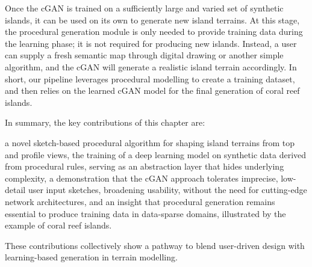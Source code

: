 Once the cGAN is trained on a sufficiently large and varied set of synthetic islands, it can be used on its own to generate new island terrains. At this stage, the procedural generation module is only needed to provide training data during the learning phase; it is not required for producing new islands. Instead, a user can supply a fresh semantic map through digital drawing or another simple algorithm, and the cGAN will generate a realistic island terrain accordingly. In short, our pipeline leverages procedural modelling to create a training dataset, and then relies on the learned cGAN model for the final generation of coral reef islands.


In summary, the key contributions of this chapter are:
\begin{Itemize}
\Item{} a novel sketch-based procedural algorithm for shaping island terrains from top and profile views,
\Item{} the training of a deep learning model on synthetic data derived from procedural rules, serving as an abstraction layer that hides underlying complexity,
\Item{} a demonstration that the cGAN approach tolerates imprecise, low-detail user input sketches, broadening usability, without the need for cutting-edge network architectures,
\Item{} and an insight that procedural generation remains essential to produce training data in data-sparse domains, illustrated by the example of coral reef islands.
\end{Itemize}
These contributions collectively show a pathway to blend user-driven design with learning-based generation in terrain modelling.














